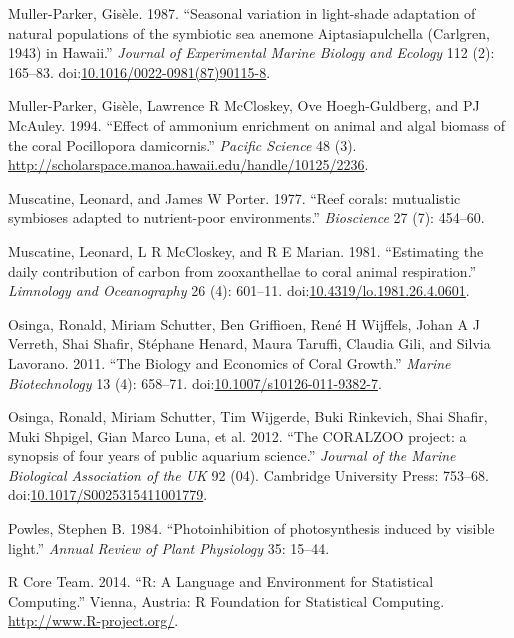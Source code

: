 \documentclass[]{elsarticle} %
\begin{document}
\hypertarget{ref-MullerParker:1987cr}{}
Muller-Parker, Gisèle. 1987. ``Seasonal variation in light-shade
adaptation of natural populations of the symbiotic sea anemone
Aiptasiapulchella (Carlgren, 1943) in Hawaii.'' \emph{Journal of
Experimental Marine Biology and Ecology} 112 (2): 165--83.
doi:\href{https://doi.org/10.1016/0022-0981(87)90115-8}{10.1016/0022-0981(87)90115-8}.

\hypertarget{ref-MullerParker:1994uo}{}
Muller-Parker, Gisèle, Lawrence R McCloskey, Ove Hoegh-Guldberg, and PJ
McAuley. 1994. ``Effect of ammonium enrichment on animal and algal
biomass of the coral Pocillopora damicornis.'' \emph{Pacific Science} 48
(3). \url{http://scholarspace.manoa.hawaii.edu/handle/10125/2236}.

\hypertarget{ref-Muscatine:1977p4220}{}
Muscatine, Leonard, and James W Porter. 1977. ``Reef corals: mutualistic
symbioses adapted to nutrient-poor environments.'' \emph{Bioscience} 27
(7): 454--60.

\hypertarget{ref-Muscatine:1981jy}{}
Muscatine, Leonard, L R McCloskey, and R E Marian. 1981. ``Estimating
the daily contribution of carbon from zooxanthellae to coral animal
respiration.'' \emph{Limnology and Oceanography} 26 (4): 601--11.
doi:\href{https://doi.org/10.4319/lo.1981.26.4.0601}{10.4319/lo.1981.26.4.0601}.

\hypertarget{ref-Osinga:2011kq}{}
Osinga, Ronald, Miriam Schutter, Ben Griffioen, René H Wijffels, Johan A
J Verreth, Shai Shafir, Stéphane Henard, Maura Taruffi, Claudia Gili,
and Silvia Lavorano. 2011. ``The Biology and Economics of Coral
Growth.'' \emph{Marine Biotechnology} 13 (4): 658--71.
doi:\href{https://doi.org/10.1007/s10126-011-9382-7}{10.1007/s10126-011-9382-7}.

\hypertarget{ref-Osinga:2012is}{}
Osinga, Ronald, Miriam Schutter, Tim Wijgerde, Buki Rinkevich, Shai
Shafir, Muki Shpigel, Gian Marco Luna, et al. 2012. ``The CORALZOO
project: a synopsis of four years of public aquarium science.''
\emph{Journal of the Marine Biological Association of the UK} 92 (04).
Cambridge University Press: 753--68.
doi:\href{https://doi.org/10.1017/S0025315411001779}{10.1017/S0025315411001779}.

\hypertarget{ref-Powles:1984tm}{}
Powles, Stephen B. 1984. ``Photoinhibition of photosynthesis induced by
visible light.'' \emph{Annual Review of Plant Physiology} 35: 15--44.

\hypertarget{ref-RALanguageandEn:2014wf}{}
R Core Team. 2014. ``R: A Language and Environment for Statistical
Computing.'' Vienna, Austria: R Foundation for Statistical Computing.
\url{http://www.R-project.org/}.
\end{document}
